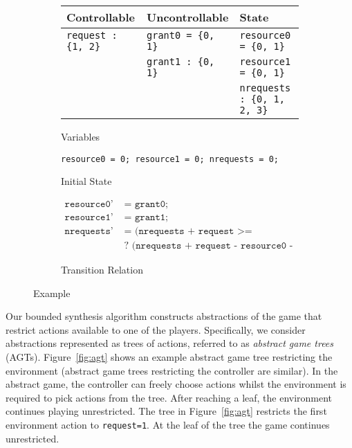 \begin{figure}
    \begin{subfigure}[t]{\textwidth}
        \centering
        \begin{tabular}{l | l | l}
            \textbf{Controllable} & \textbf{Uncontrollable} & \textbf{State} \\
            \hline
            \texttt{request : \{1, 2\}} & \texttt{grant0 = \{0, 1\}} & \texttt{resource0 = \{0, 1\}} \\
            & \texttt{grant1 : \{0, 1\}} & \texttt{resource1 = \{0, 1\}} \\
            & & \texttt{nrequests : \{0, 1, 2, 3\}} \\
        \end{tabular}
        \caption{Variables}
        \label{fig:examplevars}
    \end{subfigure}

    \begin{subfigure}[t]{\textwidth}
        \centering
        \texttt{resource0 = 0; resource1 = 0; nrequests = 0;}
        \caption{Initial State}
        \label{fig:exampleinit}
    \end{subfigure}

    \begin{subfigure}[t]{\textwidth}
        \begin {align*}
            \texttt{resource0'} & \texttt{ = grant0;} \\
            \texttt{resource1'} & \texttt{ = grant1;} \\
            \texttt{nrequests'} & \texttt{ = (nrequests + request >= resource0 + resource1)} \\ 
                                & \texttt{ ? (nrequests + request - resource0 - resource1) : 0;}
        \end{align*}
        \caption{Transition Relation}
        \label{fig:exampletrans}
    \end{subfigure}
    \caption{Example}
    \label{fig:example}
\end{figure}

Our bounded synthesis algorithm constructs abstractions of the game 
that restrict actions available to one of the players.
Specifically, we consider abstractions represented as trees of actions,
referred to as \emph{abstract game trees} (AGTs).  Figure~\ref{fig:agt} shows
an example abstract game tree restricting the environment (abstract game trees
restricting the controller are similar).  In the abstract game, the controller
can freely choose actions whilst the environment is required to pick actions
from the tree.  After reaching a leaf, the environment continues playing
unrestricted.  The tree in Figure~\ref{fig:agt} restricts the first environment
action to \texttt{request=1}. At the leaf of the tree the game continues
unrestricted.

